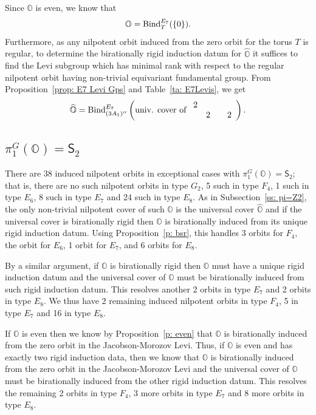 \documentclass[11pt]{amsart}
\renewcommand{\O}{{\mathbb O}}
\newcommand{\Sym}{{\mathsf{S}}}
\newcommand{\BInd}{{{\mbox{\rm Bind}}}}
\newcommand{\hatO}{\widehat{\O}}
\numberwithin{equation}{section}
\begin{document}
	 Since $\O$ is even, we know that $$\O=\BInd_{T}^{E_7}(\{0\}).$$ Furthermore, as any nilpotent orbit induced from the zero orbit for the torus $T$ is regular, to determine the birationally rigid induction datum for $\hatO$ it suffices to find the Levi subgroup which has minimal rank with respect to the regular nilpotent orbit having non-trivial equivariant fundamental group. From Proposition~\ref{prop: E7 Levi Gps} and Table~\ref{ta: E7Levis}, we get $$\hatO=\BInd_{(3 A_1)''}^{E_7}\left( \mbox{univ. cover of } \begin{array}{c c c c}
		2 & & & \\
		& 2 & & 2 \\
	\end{array}\right).$$
	\fi
	
	\subsection{\texorpdfstring{$\pi_1^G(\O)=\Sym_2$}{pi=S2}}\label{ss: pi=S2}
	
	There are 38 induced nilpotent orbits in exceptional cases with $\pi_1^G(\O)=\Sym_2$; that is, there are no such nilpotent orbits in type $G_2$, 5 such in type $F_4$, 1 such in type $E_6$, 8 such in type $E_7$ and 24 such in type $E_8$. As in Subsection~\ref{ss: pi=Z2}, the only non-trivial nilpotent cover of such $\O$ is the universal cover $\hatO$ and if the universal cover is birationally rigid then $\O$ is birationally induced from its unique rigid induction datum. Using Proposition~\ref{p: bsr}, this handles 3 orbits for $F_4$,  the orbit for $E_6$, 1 orbit for $E_7$, and 6 orbits for $E_8$.
	
	By a similar argument, if $\O$ is birationally rigid then $\O$ must have a unique rigid induction datum and the universal cover of $\O$ must be birationally induced from such rigid induction datum. This resolves another 2 orbits in type $E_7$ and 2 orbits in type $E_8$. We thus have 2 remaining induced nilpotent orbits in type $F_4$, 5 in type $E_7$ and 16 in type $E_8$.
	
	If $\O$ is even then we know by Proposition~\ref{p: even} that $\O$ is birationally induced from the zero orbit in the Jacobson-Morozov Levi. Thus, if $\O$ is even and has exactly two rigid induction data, then we know that $\O$ is birationally induced from the zero orbit in the Jacobson-Morozov Levi and the universal cover of $\O$ must be birationally induced from the other rigid induction datum. This resolves the remaining 2 orbits in type $F_4$, 3 more orbits in type $E_7$ and 8 more orbits in type $E_8$. 
	
\end{document}
